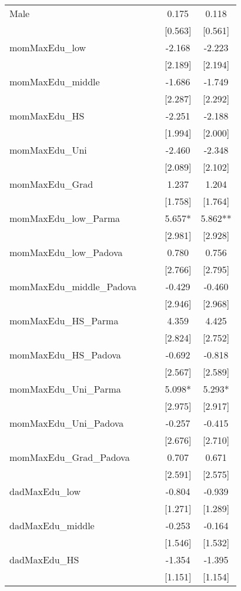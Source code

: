 \documentclass[]{article}
\begin{document}
\begin{tabular}{lcccc}
Male &  &  & 0.175 & 0.118 \\
 &  &  & [0.563] & [0.561] \\
momMaxEdu\_low &  &  & -2.168 & -2.223 \\
 &  &  & [2.189] & [2.194] \\
momMaxEdu\_middle &  &  & -1.686 & -1.749 \\
 &  &  & [2.287] & [2.292] \\
momMaxEdu\_HS &  &  & -2.251 & -2.188 \\
 &  &  & [1.994] & [2.000] \\
momMaxEdu\_Uni &  &  & -2.460 & -2.348 \\
 &  &  & [2.089] & [2.102] \\
momMaxEdu\_Grad &  &  & 1.237 & 1.204 \\
 &  &  & [1.758] & [1.764] \\
momMaxEdu\_low\_Parma &  &  & 5.657* & 5.862** \\
 &  &  & [2.981] & [2.928] \\
momMaxEdu\_low\_Padova &  &  & 0.780 & 0.756 \\
 &  &  & [2.766] & [2.795] \\
momMaxEdu\_middle\_Padova &  &  & -0.429 & -0.460 \\
 &  &  & [2.946] & [2.968] \\
momMaxEdu\_HS\_Parma &  &  & 4.359 & 4.425 \\
 &  &  & [2.824] & [2.752] \\
momMaxEdu\_HS\_Padova &  &  & -0.692 & -0.818 \\
 &  &  & [2.567] & [2.589] \\
momMaxEdu\_Uni\_Parma &  &  & 5.098* & 5.293* \\
 &  &  & [2.975] & [2.917] \\
momMaxEdu\_Uni\_Padova &  &  & -0.257 & -0.415 \\
 &  &  & [2.676] & [2.710] \\
momMaxEdu\_Grad\_Padova &  &  & 0.707 & 0.671 \\
 &  &  & [2.591] & [2.575] \\
dadMaxEdu\_low &  &  & -0.804 & -0.939 \\
 &  &  & [1.271] & [1.289] \\
dadMaxEdu\_middle &  &  & -0.253 & -0.164 \\
 &  &  & [1.546] & [1.532] \\
dadMaxEdu\_HS &  &  & -1.354 & -1.395 \\
 &  &  & [1.151] & [1.154] \\

\end{tabular}
\end{document}
